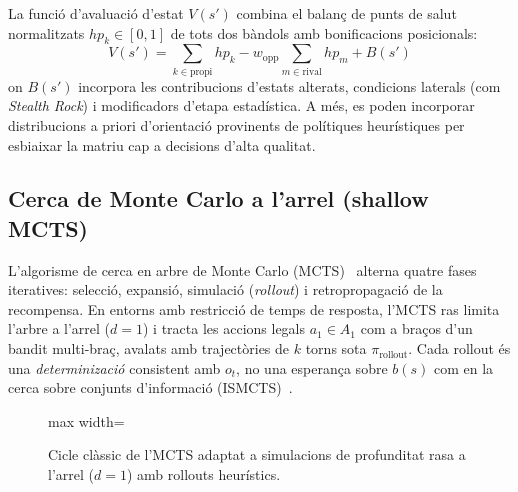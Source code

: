 La funció d'avaluació d'estat $V(s')$ combina el balanç de punts de salut normalitzats $hp_k \in [0, 1]$ de tots dos bàndols amb bonificacions posicionals:
\begin{equation}
    V(s') = \sum_{k \in \text{propi}} hp_k - w_{\mathrm{opp}} \sum_{m \in \text{rival}} hp_m + B(s')
    \label{eq:minimax_eval}
\end{equation}
on $B(s')$ incorpora les contribucions d'estats alterats, condicions laterals (com \emph{Stealth Rock}) i modificadors d'etapa estadística. A més, es poden incorporar distribucions a priori d'orientació provinents de polítiques heurístiques per esbiaixar la matriu cap a decisions d'alta qualitat.

\subsection{Cerca de Monte Carlo a l'arrel (shallow MCTS)}
\label{subsec:teoria_mcts}

L'algorisme de cerca en arbre de Monte Carlo (MCTS)~\cite{mcts_survey, coulom_mcts} alterna quatre fases iteratives: selecció, expansió, simulació (\emph{rollout}) i retropropagació de la recompensa. En entorns amb restricció de temps de resposta, l'MCTS ras limita l'arbre a l'arrel ($d=1$) i tracta les accions legals $a_1 \in A_1$ com a braços d'un bandit multi-braç, avalats amb trajectòries de $k$ torns sota $\pi_{\text{rollout}}$. Cada rollout és una \emph{determinizació} consistent amb $o_t$, no una esperança sobre $b(s)$ com en la cerca sobre conjunts d'informació (ISMCTS)~\cite{ismcts_cowling}.

\begin{figure}[htbp]
    \centering
    \begin{adjustbox}{max width=\linewidth}
    \end{adjustbox}
    \caption{Cicle clàssic de l'MCTS adaptat a simulacions de profunditat rasa a l'arrel ($d=1$) amb rollouts heurístics.}
    \label{fig:mcts_cycle}
\end{figure}

